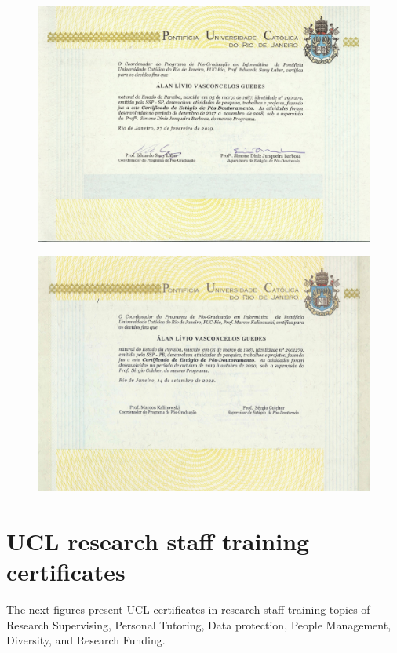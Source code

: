 \documentclass[10pt,a4paper,sans,colorlinks]{moderncv}
\begin{document}
\begin{figure}
    \centering
    \includegraphics[align=t,width=\textwidth,height=0.3\paperheight, keepaspectratio=true]{certificates/postdoc-pucrio-2017-certificate.pdf}
\end{figure}

\begin{figure}
    \centering
    \includegraphics[align=t,width=\textwidth,height=0.3\paperheight, keepaspectratio=true]{certificates/postdoc-pucrio-2018-certificate.pdf}
\end{figure}


\newpage
\section{UCL research staff training certificates}
The next figures present UCL certificates in research staff training topics of Research Supervising, Personal Tutoring, Data protection, People Management, Diversity, and Research Funding.
\end{document}
